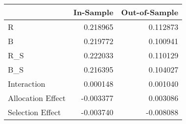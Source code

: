 \begin{tabular}{lrr}
\toprule
{} &  In-Sample &  Out-of-Sample \\
\midrule
R                 &   0.218965 &       0.112873 \\
B                 &   0.219772 &       0.100941 \\
R\_S               &   0.222033 &       0.110129 \\
B\_S               &   0.216395 &       0.104027 \\
Interaction       &   0.000148 &       0.001040 \\
Allocation Effect &  -0.003377 &       0.003086 \\
Selection Effect  &  -0.003740 &      -0.008088 \\
\bottomrule
\end{tabular}

